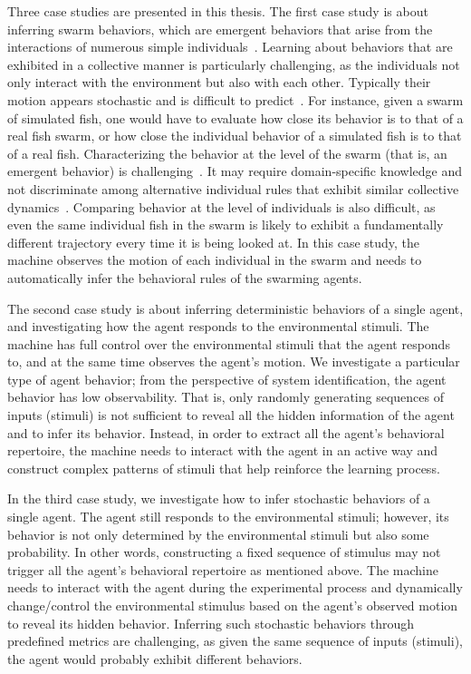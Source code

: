 Three case studies are presented in this thesis. The first case study is about inferring swarm behaviors, which are emergent behaviors that arise from the interactions of numerous simple individuals~\cite{Camazine2001}. Learning about behaviors that are exhibited in a collective manner is particularly challenging, as the individuals not only interact with the environment but also with each other. Typically their motion appears stochastic and is difficult to predict~\cite{Dirk2011}. For instance, given a swarm of simulated fish, one would have to evaluate how close its behavior is to that of a real fish swarm, or how close the individual behavior of a simulated fish is to that of a real fish. Characterizing the behavior at the level of the swarm (that is, an emergent behavior) is challenging~\cite{Harvey:SI:2015}. It may require domain-specific knowledge and not discriminate among alternative individual rules that exhibit similar collective dynamics~\cite{Weitz2012}. Comparing behavior at the level of individuals is also difficult, as even the same individual fish in the swarm is likely to exhibit a fundamentally different trajectory every time it is being looked at. In this case study, the machine observes the motion of each individual in the swarm and needs to automatically infer the behavioral rules of the swarming agents.

The second case study is about inferring deterministic behaviors of a single agent, and investigating how the agent responds to the environmental stimuli. The machine has full control over the environmental stimuli that the agent responds to, and at the same time observes the agent's motion. We investigate a particular type of agent behavior; from the perspective of system identification, the agent behavior has low observability. That is, only randomly generating sequences of inputs (stimuli) is not sufficient to reveal all the hidden information of the agent and to infer its behavior. Instead, in order to extract all the agent's behavioral repertoire, the machine needs to interact with the agent in an active way and construct complex patterns of stimuli that help reinforce the learning process. 

In the third case study, we investigate how to infer stochastic behaviors of a single agent. The agent still responds to the environmental stimuli; however, its behavior is not only determined by the environmental stimuli but also some probability. In other words, constructing a fixed sequence of stimulus may not trigger all the agent's behavioral repertoire as mentioned above. The machine needs to interact with the agent during the experimental process and dynamically change/control the environmental stimulus based on the agent's observed motion to reveal its hidden behavior. Inferring such stochastic behaviors through predefined metrics are challenging, as given the same sequence of inputs (stimuli), the agent would probably exhibit different behaviors. 

